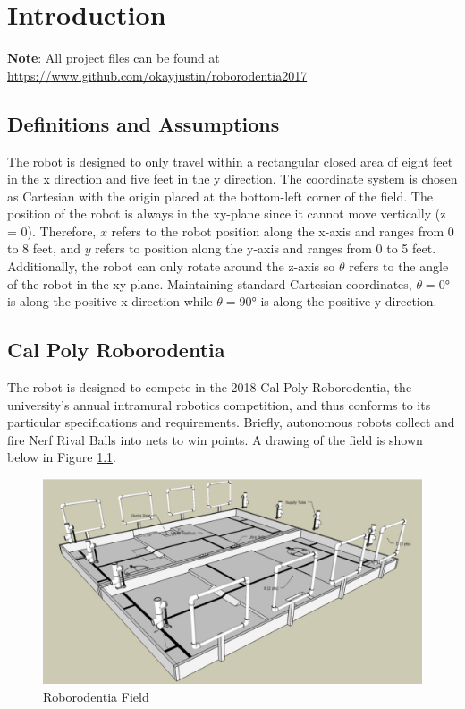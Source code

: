 \chapter{Introduction}

\textbf{Note}: All project files can be found at \url{https://www.github.com/okayjustin/roborodentia2017} \

\section{Definitions and Assumptions}
The robot is designed to only travel within a rectangular closed area of eight feet in the x direction and five feet in the y direction. The coordinate system is chosen as Cartesian with the origin placed at the bottom-left corner of the field. The position of the robot is always in the xy-plane since it cannot move vertically (z = 0). Therefore, $x$ refers to the robot position along the x-axis and ranges from 0 to 8 feet, and $y$ refers to position along the y-axis and ranges from 0 to 5 feet. Additionally, the robot can only rotate around the z-axis so $\theta$ refers to the angle of the robot in the xy-plane. Maintaining standard Cartesian coordinates, $\theta=\ang{0}$ is along the positive x direction while $\theta=\ang{90}$ is along the positive y direction.

\section{Cal Poly Roborodentia}
The robot is designed to compete in the 2018 Cal Poly Roborodentia, the university's annual intramural robotics competition, and thus conforms to its particular specifications and requirements. Briefly, autonomous robots collect and fire Nerf Rival Balls into nets to win points. A drawing of the field is shown below in Figure  \ref{fig:roborodentia_field}. 

\begin{figure}[H]   %
	\centering
	\includegraphics[width=7in]{figures/roborodentia_field.png}
	\caption{Roborodentia Field}
	\label{fig:roborodentia_field}
\end{figure}



